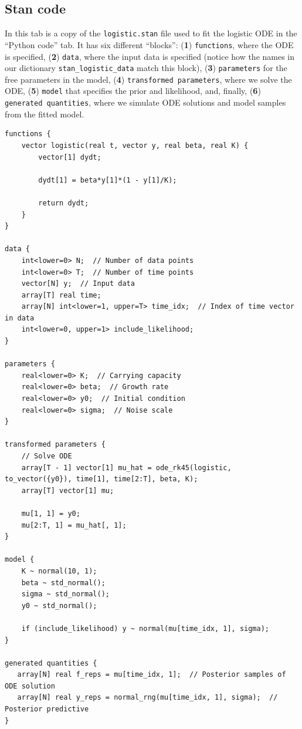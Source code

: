 \documentclass[
  12pt,
]{article}
\begin{document}
\subsection{Stan code}\label{stan-code}

In this tab is a copy of the \texttt{logistic.stan} file used to fit the
logistic ODE in the ``Python code'' tab. It has six different
``blocks'': (\textbf{1}) \texttt{functions}, where the ODE is specified,
(\textbf{2}) \texttt{data}, where the input data is specified (notice
how the names in our dictionary \texttt{stan\_logistic\_data} match this
block), (\textbf{3}) \texttt{parameters} for the free parameters in the
model, (\textbf{4}) \texttt{transformed\ parameters}, where we solve the
ODE, (\textbf{5}) \texttt{model} that specifies the prior and
likelihood, and, finally, (\textbf{6}) \texttt{generated\ quantities},
where we simulate ODE solutions and model samples from the fitted model.

\begin{verbatim}
functions {
    vector logistic(real t, vector y, real beta, real K) {
        vector[1] dydt;

        dydt[1] = beta*y[1]*(1 - y[1]/K);

        return dydt;
    }
}

data {
    int<lower=0> N;  // Number of data points
    int<lower=0> T;  // Number of time points
    vector[N] y;  // Input data
    array[T] real time;
    array[N] int<lower=1, upper=T> time_idx;  // Index of time vector in data
    int<lower=0, upper=1> include_likelihood;
}

parameters {
    real<lower=0> K;  // Carrying capacity
    real<lower=0> beta;  // Growth rate
    real<lower=0> y0;  // Initial condition
    real<lower=0> sigma;  // Noise scale
}

transformed parameters {
    // Solve ODE
    array[T - 1] vector[1] mu_hat = ode_rk45(logistic, to_vector({y0}), time[1], time[2:T], beta, K);
    array[T] vector[1] mu;

    mu[1, 1] = y0;
    mu[2:T, 1] = mu_hat[, 1];
}

model {
    K ~ normal(10, 1);
    beta ~ std_normal();
    sigma ~ std_normal();
    y0 ~ std_normal();

    if (include_likelihood) y ~ normal(mu[time_idx, 1], sigma);
}

generated quantities {
   array[N] real f_reps = mu[time_idx, 1];  // Posterior samples of ODE solution
   array[N] real y_reps = normal_rng(mu[time_idx, 1], sigma);  // Posterior predictive
}
\end{verbatim}
\end{document}
